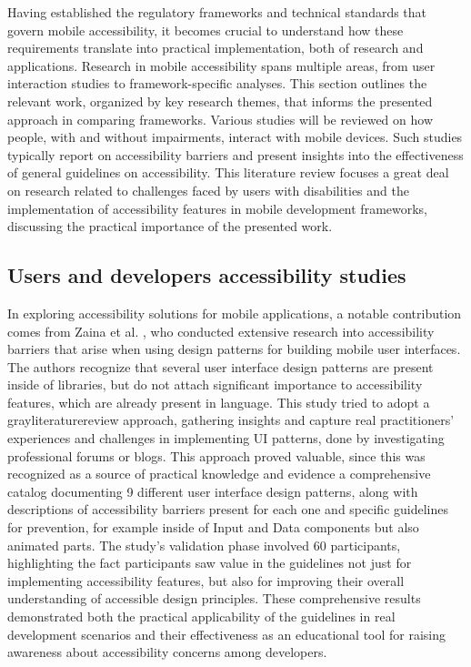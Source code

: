 Having established the regulatory frameworks and technical standards that govern mobile accessibility, it becomes crucial to understand how these requirements translate into practical implementation, both of research and applications. 
Research in mobile accessibility spans multiple areas, from user interaction studies to framework-specific analyses. This section outlines the relevant work, organized by key research themes, that informs the presented approach in comparing frameworks. Various studies will be reviewed on how people, with and without impairments, interact with mobile devices. Such studies typically report on accessibility barriers and present insights into the effectiveness of general guidelines on accessibility. This literature review focuses a great deal on research related to challenges faced by users with disabilities and the implementation of accessibility features in mobile development frameworks, discussing the practical importance of the presented work.

\subsection{Users and developers accessibility studies}

In exploring accessibility solutions for mobile applications, a notable contribution comes from Zaina et al. \cite{zaina2022preventing}, who conducted extensive research into accessibility barriers that arise when using design patterns for building mobile user interfaces. The authors recognize that several user interface design patterns are present inside of libraries, but do not attach significant importance to accessibility features, which are already present in language. This study tried to adopt a \gls{grayliteraturereview} approach, gathering insights and capture real practitioners' experiences and challenges in implementing UI patterns, done by investigating professional forums or blogs. This approach proved valuable, since this was recognized as a source of practical knowledge and evidence a comprehensive catalog documenting 9 different user interface design patterns, along with descriptions of accessibility barriers present for each one and specific guidelines for prevention, for example inside of Input and Data components but also animated parts. The study's validation phase involved 60 participants, highlighting the fact participants saw value in the guidelines not just for implementing accessibility features, but also for improving their overall understanding of accessible design principles. These comprehensive results demonstrated both the practical applicability of the guidelines in real development scenarios and their effectiveness as an educational tool for raising awareness about accessibility concerns among developers.\\

